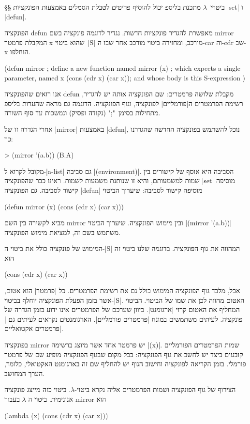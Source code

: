 §§ ביטויי~$λ$
מתכנת בליספ יכול להוסיף פריטים לטבלת הסמלים באמצעות הפונקציות \E|set|
ו-\E|defun|.

הפונקציה defun מאפשרת להגדיר פונקציות חדשות. נגדיר לדוגמה פונקציה בשם mirror
המקבלת פרמטר x שהוא ביטוי~\E|S| מורכב, ומחזירה ביטוי מורכב אחר שבו ה-car וה-cdr
שב-x הוחלפו.
\begin{LISP}
(defun mirror ; define a new function named mirror
  (x) ; which expects a single parameter, named x
  (cons (cdr x) (car x)); and whose body is this S-expression
)
\end{LISP}
אנו רואים שהפונקציה defun מקבלת שלושה פרמטרים: שם הפונקציה אותה יש להגדיר,
רשימת הפרמטרים ה\ע|פורמליים| לפונקציה, וגוף הפונקציה. הדוגמה גם מראה שהערות
בליספ מתחילות בסימן~";" (נקודה ופסיק) ונמשכות עד סוף השורה.

אחרי הגדרה זו של \E|mirror| באמצעות \E|defun|, נוכל להשתמש בפונקציה החדשה
שהגדרנו כך:
\begin{LISP}
> (mirror '(a.b))
(B.A)
\end{LISP}

מקובל לקרוא ל-\E|a-list| גם סביבה \E|(environment)|. הסביבה היא אוסף של קישורים
בין שמות למשמעותם, והיא זו שנותנת משמעות לשמות. ראינו כבר שהפונקציה \E|set|
מוסיפה קישור לסביבה. גם הפונקציה \E|defun| מוסיפה קישור לסביבה: שיערוך הביטוי
\begin{LISP}
(defun mirror (x) (cons (cdr x) (car x)))
\end{LISP}
מביא לקשירה בין השם mirror ובין מימוש הפונקציה. שיערוך הביטוי \T|(mirror
'(a.b))| משתמש בשם זה, למציאת מימוש הפונקציה.

המימוש של פונקציה כולל את ביטוי ה-\E|S| המהווה את גוף הפונקציה. בדוגמה שלנו ביטוי
זה הוא
\begin{LISP}
(cons (cdr x) (car x))
\end{LISP}
אבל, מלבד גוף הפונקציה המימוש כולל גם את רשימת הפרמטרים. כל \ע|פרמטר|
הוא אטום, אשר בזמן הפעלת הפונקציה יוחלף בביטוי-\E|S|. האטום מהווה לכן את שמו של
הביטוי. הביטוי המחליף את האטום קרוי \ע|ארגומנט|. כיוון שערכם של הפרמטרים
אינו ידוע בזמן הגדרה של פונקציה. לעיתים משתמשים במונח \ע|פרמטרים פורמליים|.
הארגומנטים נקראים לעיתים גם \ע|פרמטרים אקטואליים|.

בפונקציה mirror יש פרמטר אחד אשר מיוצג ברשימה \T|(x)|. שמות הפרמטרים הפורמליים
קובעים כיצד יש לחשב את גוף הפונקציה: בכל מקום שבגוף הפונקציה מופיע שם של פרמטר
פורמלי. בזמן הקריאה לפונקציה וחישוב הגוף יש להחליף שם זה בארגומנט האקטואלי,
כלומר, הערך המחושב.

הצירוף של גוף הפונקציה ושמות הפרמטרים אליה נקרא ביטוי-$λ$. ביטוי כזה
מייצג פונקציה אנונימית. ביטוי ה-$λ$ בעבור mirror הוא
\begin{LISP}
  (lambda (x) (cons (cdr x) (car x)))
\end{LISP}

